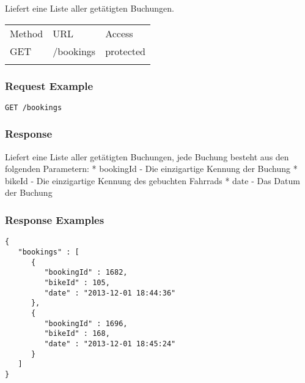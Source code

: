 Liefert eine Liste aller getätigten Buchungen.

\begin{longtable}[c]{@{}lll@{}}
\toprule\addlinespace
Method & URL & Access
\\\addlinespace
\midrule\endhead
GET & /bookings & protected
\\\addlinespace
\bottomrule
\end{longtable}

\subsubsection{Request Example}\label{request-example}

\begin{verbatim}
GET /bookings
\end{verbatim}

\subsubsection{Response}\label{response}

Liefert eine Liste aller getätigten Buchungen, jede Buchung besteht aus
den folgenden Parametern: * bookingId - Die einzigartige Kennung der
Buchung * bikeId - Die einzigartige Kennung des gebuchten Fahrrads *
date - Das Datum der Buchung

\subsubsection{Response Examples}\label{response-examples}

\begin{verbatim}
{
   "bookings" : [
      {
         "bookingId" : 1682,
         "bikeId" : 105,
         "date" : "2013-12-01 18:44:36"
      },
      {
         "bookingId" : 1696,
         "bikeId" : 168,
         "date" : "2013-12-01 18:45:24"
      }
   ]
}
\end{verbatim}
